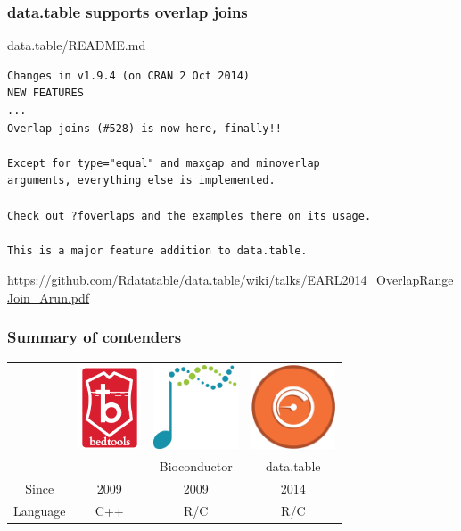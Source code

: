 \documentclass{beamer}
\begin{document}
  

\begin{frame}[fragile]
  \frametitle{data.table supports overlap joins}

data.table/README.md

\begin{verbatim}
Changes in v1.9.4 (on CRAN 2 Oct 2014)
NEW FEATURES
...
Overlap joins (#528) is now here, finally!! 

Except for type="equal" and maxgap and minoverlap 
arguments, everything else is implemented. 

Check out ?foverlaps and the examples there on its usage. 

This is a major feature addition to data.table.
\end{verbatim}

\alert{\url{https://github.com/Rdatatable/data.table/wiki/talks/EARL2014_OverlapRangeJoin_Arun.pdf}}

\end{frame}

\begin{frame}
  \frametitle{Summary of contenders}
  
  \begin{tabular}{cccc}
    &
    \includegraphics[height=2.5cm]{bedtools} &
    \includegraphics[height=2.5cm]{bioconductor} &
    \includegraphics[height=2.5cm]{datatable} \\
    &  & Bioconductor & data.table \\
    \hline
    Since & 2009 & 2009 & 2014 \\
    Language & C++ & R/C & R/C \\
  \end{tabular}
\end{frame}
\end{document}
